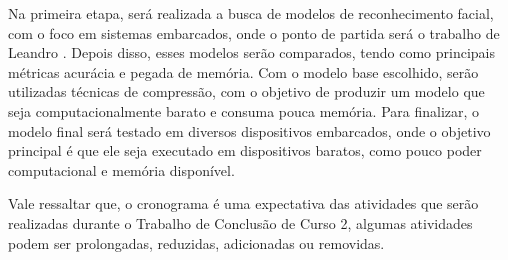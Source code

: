 Na primeira etapa, será realizada a busca de modelos de reconhecimento facial, com o foco em sistemas embarcados,
onde o ponto de partida será o trabalho de Leandro \cite{leandro}.
Depois disso, esses modelos serão comparados, tendo como principais métricas acurácia e pegada de memória.
Com o modelo base escolhido, serão utilizadas técnicas de compressão, com o objetivo de produzir um modelo que seja
computacionalmente barato e consuma pouca memória.
Para finalizar, o modelo final será testado em diversos dispositivos embarcados, onde o objetivo principal é que ele
seja executado em dispositivos baratos, como pouco poder computacional e memória disponível.

Vale ressaltar que, o cronograma é uma expectativa das atividades que serão realizadas durante o Trabalho de Conclusão
de Curso 2, algumas atividades podem ser prolongadas, reduzidas, adicionadas ou removidas.
